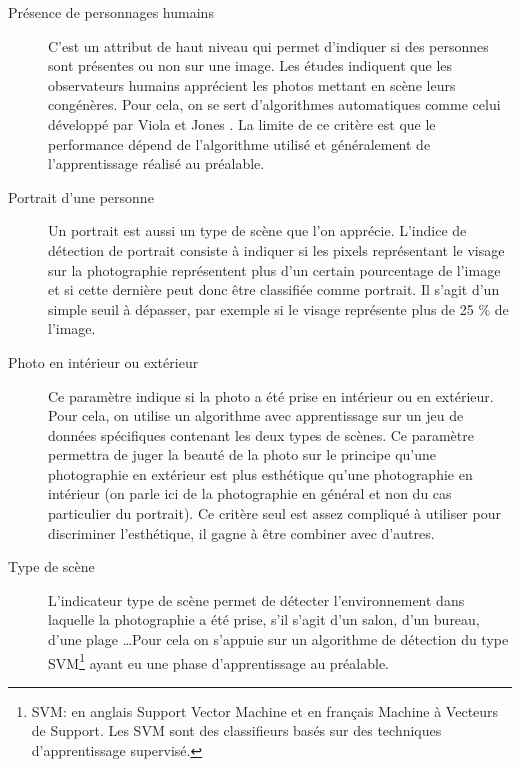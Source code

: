 \documentclass[11pt, french,screen]{report-rd-info}
\begin{document}
\begin{description}
\item[Présence de personnages humains]
C’est un attribut de haut niveau qui permet d’indiquer si des personnes sont présentes ou non sur une image. Les études indiquent que les observateurs humains apprécient les photos mettant en scène leurs congénères. Pour cela, on se sert d’algorithmes automatiques comme celui développé par Viola et Jones \cite{Viola2004}. La limite de ce critère est que le performance dépend de l’algorithme utilisé et généralement de l’apprentissage réalisé au préalable.
\item[Portrait d'une personne]
Un portrait est aussi un type de scène que l’on apprécie. L’indice de détection de portrait consiste à indiquer si les pixels représentant le visage sur la photographie représentent plus d’un certain pourcentage de l’image et si cette dernière peut donc être classifiée comme portrait. Il s’agit d’un simple seuil à dépasser, par exemple si le visage représente plus de 25 \% de l’image.
\item[Photo en intérieur ou extérieur]
Ce paramètre indique si la photo a été prise en intérieur ou en extérieur. Pour cela, on utilise un algorithme avec apprentissage sur un jeu de données spécifiques contenant les deux types de scènes. Ce paramètre permettra de juger la beauté de la photo sur le principe qu’une photographie en extérieur est plus esthétique qu’une photographie en intérieur (on parle ici de la photographie en général et non du cas particulier du portrait). Ce critère seul est assez compliqué à utiliser pour discriminer l’esthétique, il gagne à être combiner avec d’autres.
\item[Type de scène]
L’indicateur type de scène permet de détecter l’environnement dans laquelle la photographie a été prise, s’il s’agit d’un salon, d’un bureau, d’une plage \ldots Pour cela on s’appuie sur un algorithme de détection du type SVM\footnote{SVM: en anglais Support Vector Machine et en français Machine à Vecteurs de Support. Les SVM sont des classifieurs basés sur des techniques d'apprentissage supervisé.} ayant eu une phase d’apprentissage au préalable.
\end{description}
\end{document}
